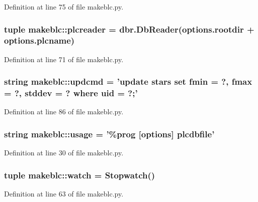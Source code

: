 Definition at line 75 of file makeblc.py.

\hypertarget{namespacemakeblc_a0f835803cfdefeaeb151f6a83e76368f}{
\subsubsection[{plcreader}]{\setlength{\rightskip}{0pt plus 5cm}tuple {\bf makeblc::plcreader} = dbr.DbReader(options.rootdir + options.plcname)}}
\label{namespacemakeblc_a0f835803cfdefeaeb151f6a83e76368f}


Definition at line 71 of file makeblc.py.

\hypertarget{namespacemakeblc_a7d13b64b84badf069728c58a2165c03d}{
\subsubsection[{updcmd}]{\setlength{\rightskip}{0pt plus 5cm}string {\bf makeblc::updcmd} = 'update stars set fmin = ?, fmax = ?, stddev = ? where uid = ?;'}}
\label{namespacemakeblc_a7d13b64b84badf069728c58a2165c03d}


Definition at line 86 of file makeblc.py.

\hypertarget{namespacemakeblc_af9d26964de16c4985555854c8d72580b}{
\subsubsection[{usage}]{\setlength{\rightskip}{0pt plus 5cm}string {\bf makeblc::usage} = '\%prog \mbox{[}options\mbox{]} plcdbfile'}}
\label{namespacemakeblc_af9d26964de16c4985555854c8d72580b}


Definition at line 30 of file makeblc.py.

\hypertarget{namespacemakeblc_ac747659361bfa898ab3b4503fd962e9c}{
\subsubsection[{watch}]{\setlength{\rightskip}{0pt plus 5cm}tuple {\bf makeblc::watch} = Stopwatch()}}
\label{namespacemakeblc_ac747659361bfa898ab3b4503fd962e9c}


Definition at line 63 of file makeblc.py.

